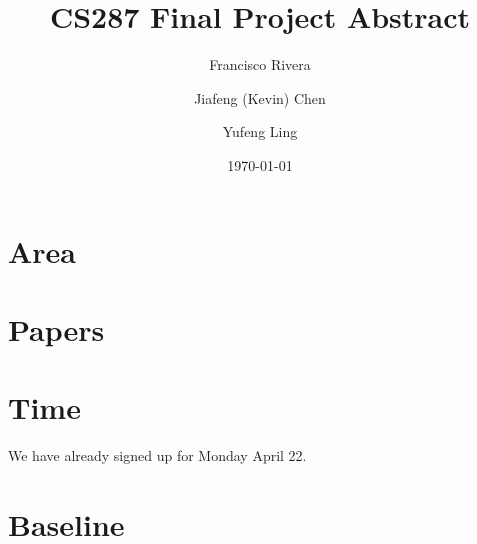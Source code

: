 \documentclass{article}
\begin{document}
\title{CS287 Final Project Abstract}
\author{Francisco Rivera \and Jiafeng (Kevin) Chen \and Yufeng Ling}
\date{\today}

\maketitle

\section{Area}


\section{Papers}


\section{Time}

We have already signed up for Monday April 22.

\section{Baseline}

\end{document}
